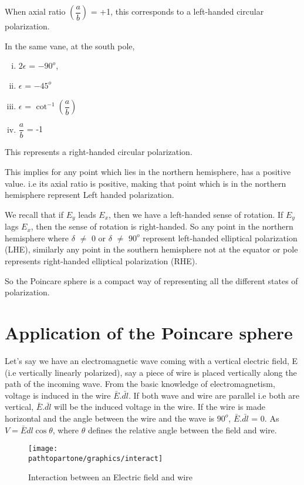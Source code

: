 When axial ratio $(\dfrac{a}{b})$ = +1, this corresponds to a left-handed circular polarization.

In the same vane, at the south pole,
\begin{enumerate}[(i)]
\item	$2\epsilon$ = $-90^{o}$, 
\item $\epsilon$ = $-45^{o}$
\item $\epsilon$ = $\cot^{-1}(\dfrac{a}{b})$
\item $\dfrac{a}{b}$ = -1
\end{enumerate}	
This represents a right-handed circular polarization.

This implies for any point which lies in the northern hemisphere, has a positive value. i.e its axial ratio is positive, making that point which is in the northern hemisphere represent Left handed polarization.

We recall that if $E_{y}$ leads $E_{x}$, then we have a left-handed sense of rotation. If $E_{y}$ lags $E_{x}$, then the sense of rotation is right-handed. So any point in the northern hemisphere where $\delta$ $\neq$ 0 or $\delta$ $\neq$ $90^{o}$ represent left-handed elliptical polarization  (LHE), similarly any point in the southern hemisphere not at the equator or pole represents right-handed elliptical polarization (RHE).

So the Poincare sphere is a compact way of representing all the different states of polarization.

\section{Application of the Poincare sphere}
Let's say we have an electromagnetic wave coming with a vertical electric field, E (i.e vertically linearly polarized), say a piece of wire is placed vertically along the path of the incoming wave. From the basic knowledge of electromagnetism, voltage is induced in the wire $\bar{E}$.$\bar{dl}$. If both wave and wire are parallel i.e both are vertical, $\bar{E}$.$\bar{dl}$ will be the induced voltage in the wire. If the wire is made horizontal and the angle between the wire and the wave is $90^{o}$, $\bar{E}$.$\bar{dl}$ = 0. As $ V = \bar{E}dl\cos\theta $, where $ \theta $ defines the relative angle between the field and wire.
\begin{figure}[h]
\centering
\texttt{[image: \\pathtopartone/graphics/interact]}
\caption{Interaction between an Electric field and wire}
\label{fig:interact}
\end{figure}

